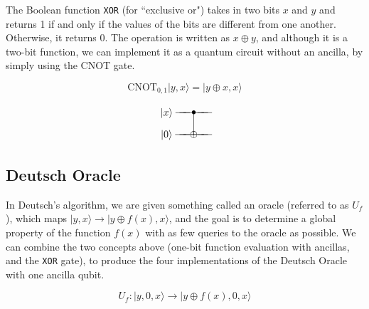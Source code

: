 \documentclass[12pt, letterpaper]{article}
\makeatletter
\def\w{\ar@{-}[l]}
\def\A#1{\save []="#1" \restore}
\def\b{*={\bullet}}
\def\o{*={\oplus}}
\def\n{*-{}\w}
\def\>{\rangle}
\def\q#1{*+{\rule[-0.2ex]{0ex}{2.1ex}|#1\>}}
\makeatother
\begin{document}
The Boolean function \texttt{XOR} (for ``exclusive or") takes in two bits $x$ and $y$ and returns 1 if and only if the values of the bits are different from one another. Otherwise, it returns 0. The operation is written as $x \oplus y$, and although it is a two-bit function, we can implement it as a quantum circuit without an ancilla, by simply using the \textrm{CNOT} gate.

\begin{equation}
\textrm{CNOT}_{0,1}|y, x\rangle = |y \oplus x, x\rangle
\end{equation}

\def\gAxA{\b\w\A{gAxA}}
\def\gAxB{\o\w\A{gAxB}}
\def\bA{ \q{x}}
\def\bB{ \q{0}}
$$\xymatrix@R=5pt@C=10pt{
    \bA &\n &\n &\gAxA &\n &\n &\n
\\  \bB &\n &\n &\gAxB &\n &\n &\n
\ar@{-}"gAxB";"gAxA"
}$$

\subsection{Deutsch Oracle}

In Deutsch's algorithm, we are given something called an oracle (referred to as $U_f$), which maps $|y, x\rangle \rightarrow |y \oplus f(x), x\rangle$, and the goal is to determine a global property of the function $f(x)$ with as few queries to the oracle as possible. We can combine the two concepts above (one-bit function evaluation with ancillas, and the \texttt{XOR} gate), to produce the four implementations of the Deutsch Oracle with one ancilla qubit.

\begin{equation}
U_f : |y, 0, x\rangle \rightarrow |y \oplus f(x), 0, x\rangle
\end{equation}
\end{document}
